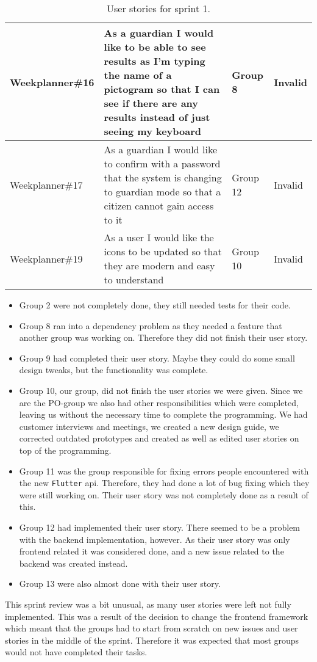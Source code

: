 \begin{table}[!ht]
\begin{tabular}{|p{2.8cm}|p{7cm}|p{2cm}|p{1.5cm}|}
    Weekplanner\#16 & As a guardian I would like to be able to see results as I'm typing the name of a pictogram so that I can see if there are any results instead of just seeing my keyboard & Group 8         & Invalid    \\ \hline
    Weekplanner\#17 & As a guardian I would like to confirm with a password that the system is changing to guardian mode so that a citizen cannot gain access to it                            & Group 12        & Invalid    \\ \hline
    Weekplanner\#19 & As a user I would like the icons to be updated so that they are modern and easy to understand                                                                            & Group 10        & Invalid    \\ \hline
    \end{tabular}
    \caption{User stories for sprint 1.}
\end{table}

\begin{itemize}
    \item Group 2 were not completely done, they still needed tests for their code.
    \item Group 8 ran into a dependency problem as they needed a feature that another group was working on. Therefore they did not finish their user story.
    \item Group 9 had completed their user story. Maybe they could do some small design tweaks, but the functionality was complete.
    \item Group 10, our group, did not finish the user stories we were given. Since we are the PO-group we also had other responsibilities which were completed, leaving us without the necessary time to complete the programming. We had customer interviews and meetings, we created a new design guide, we corrected outdated prototypes and created as well as edited user stories on top of the programming.
    \item Group 11 was the group responsible for fixing errors people encountered with the new \texttt{Flutter} api. Therefore, they had done a lot of bug fixing which they were still working on. Their user story was not completely done as a result of this.
    \item Group 12 had implemented their user story. There seemed to be a problem with the backend implementation, however. As their user story was only frontend related it was considered done, and a new issue related to the backend was created instead.
    \item Group 13 were also almost done with their user story.
\end{itemize}
\noindent
This sprint review was a bit unusual, as many user stories were left not fully implemented. This was a result of the decision to change the frontend framework which meant that the groups had to start from scratch on new issues and user stories in the middle of the sprint.
Therefore it was expected that most groups would not have completed their tasks.
